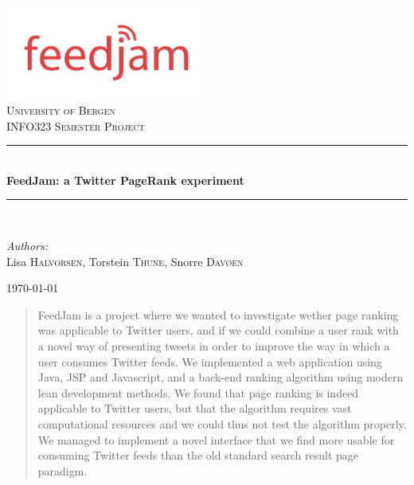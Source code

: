 \documentclass[a4paper]{article}
\newcommand{\HRule}{\rule{\linewidth}{0.5mm}}
\begin{document}
\begin{titlepage}

\begin{center}


\href{http://feedjam.thunemedia.no}{\includegraphics[width=0.5\textwidth]{figures/feedjam.png}}\\[1cm]

\textsc{\LARGE University of Bergen}\\[1.5cm]

\textsc{\Large INFO323 Semester Project}\\[0.5cm]


\HRule \\[0.4cm]
{ \huge \bfseries FeedJam: a Twitter PageRank experiment}\\[0.4cm]

\HRule \\[1.5cm]

\begin{minipage}{1\textwidth}
\begin{center} \large
\emph{Authors:}\\
Lisa \textsc{Halvorsen}, Torstein \textsc{Thune}, Snorre \textsc{Davøen}
\end{center}
\end{minipage}


\vfill

{\large \today}

\end{center}

\end{titlepage}

\begin{abstract}
FeedJam is a project where we wanted to investigate wether page ranking was applicable to Twitter users, and if we could combine a user rank with a novel way of presenting tweets in order to improve the way in which a user consumes Twitter feeds. We implemented a web application using Java, JSP and Javascript, and a back-end ranking algorithm using modern lean development methods. We found that page ranking is indeed applicable to Twitter users, but that the algorithm requires vast computational resources and we could thus not test the algorithm properly. We managed to implement a novel interface that we find more usable for consuming Twitter feeds than the old standard search result page paradigm.

\end{abstract}
\newpage
\end{document}
